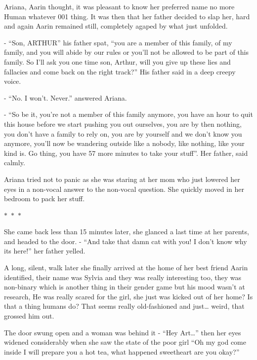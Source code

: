 \documentclass[hidelinks,12pt,a4paper]{book}
\newcommand\sep{\begin{center}
  $\ast$~$\ast$~$\ast$
\end{center}}
\begin{document}
Ariana, Aarin thought, it was pleasant to know her preferred name no more Human whatever 001 thing.\newline
It was then that her father decided to slap her, hard and again Aarin remained still, 
completely agaped by what just unfolded.\par
\bigskip

- “Son, ARTHUR” his father spat, “you are a member of this family, of my family, and you will abide by our rules 
or you'll not be allowed to be part of this family. So I'll ask you one time son, Arthur, 
will you give up these lies and fallacies and come back on the right track?” His father said in a deep creepy voice.\newline

- “No. I won't. Never.” answered Ariana.\newline

- “So be it, you're not a member of this family anymore, you have an hour 
to quit this house before we start pushing you out ourselves, you are by then nothing, 
you don't have a family to rely on, you are by yourself and we don't know you anymore, 
you'll now be wandering outside like a nobody, like nothing, like your kind is. Go thing, 
you have 57 more minutes to take your stuff”. Her father, said calmly.\par
\bigskip

Ariana tried not to panic as she was staring at her mom who just lowered her eyes in a 
non-vocal answer to the non-vocal question. She quickly moved in her bedroom to pack her stuff.

\sep 

She came back less than 15 minutes later, she glanced a last time at her parents, and headed to the door.\newline
- “And take that damn cat with you! I don't know why its here!” her father yelled.\par
\bigskip

A long, silent, walk later she finally arrived at the home of her best friend Aarin identified, 
their name was Sylvia and they was really interesting too, they was non-binary which is another thing in their 
gender game but his mood wasn't at research, He was really scared for the girl, she just was kicked out of
 her home? Is that a thing humans do? That seems really old-fashioned and just… weird, that grossed him out.\par
 \bigskip

The door swung open and a woman was behind it\newline
- “Hey Art…” then her eyes widened considerably when she saw the state of the poor girl 
“Oh my god come inside I will prepare you a hot tea, what happened sweetheart are you okay?”\par
\bigskip
\end{document}
